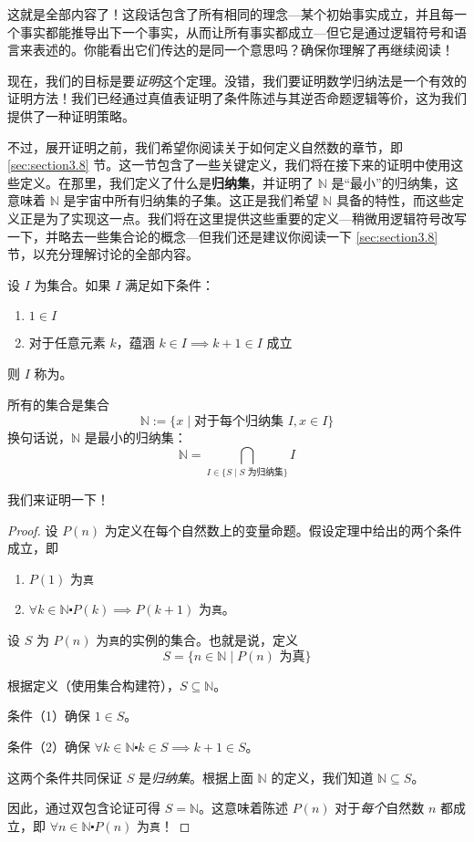 这就是全部内容了！这段话包含了所有相同的理念---某个初始事实成立，并且每一个事实都能推导出下一个事实，从而让所有事实都成立---但它是通过逻辑符号和语言来表述的。你能看出它们传达的是同一个意思吗？确保你理解了再继续阅读！

现在，我们的目标是要\emph{证明}这个定理。没错，我们要证明数学归纳法是一个有效的证明方法！我们已经通过真值表证明了条件陈述与其逆否命题逻辑等价，这为我们提供了一种证明策略。

不过，展开证明之前，我们希望你阅读关于如何定义自然数的章节，即 \ref{sec:section3.8} 节。这一节包含了一些关键定义，我们将在接下来的证明中使用这些定义。在那里，我们定义了什么是\textbf{归纳集}，并证明了 $\mathbb{N}$ 是``最小''的归纳集，这意味着 $\mathbb{N}$ 是宇宙中所有归纳集的子集。这正是我们希望 $\mathbb{N}$ 具备的特性，而这些定义正是为了实现这一点。我们将在这里提供这些重要的定义---稍微用逻辑符号改写一下，并略去一些集合论的概念---但我们还是建议你阅读一下 \ref{sec:section3.8} 节，以充分理解讨论的全部内容。

\begin{definition}
    设 $I$ 为集合。如果 $I$ 满足如下条件：
    \begin{enumerate}
        \item $1 \in I$
        \item 对于任意元素 $k$，蕴涵 $k \in I \implies k + 1 \in I$ 成立
    \end{enumerate}
    则 $I$ 称为。
\end{definition}

\begin{definition}
    所有的集合是集合
    \[\mathbb{N}:=\{x \mid \text{对于每个归纳集 }I, x \in I\}\]
    换句话说，$\mathbb{N}$ 是最小的归纳集：
    \[\mathbb{N} = \bigcap_{I \in \{S \mid S \text{ 为归纳集}\}} I\] 
\end{definition}

我们来证明一下！

\begin{proof}
    设 $P(n)$ 为定义在每个自然数上的变量命题。假设定理中给出的两个条件成立，即
    \begin{enumerate}[label=(\arabic*)]
        \item $P(1)$ 为\verb|真|
        \item $\forall k \in \mathbb{N} \centerdot P(k) \implies P(k+1)$ 为\verb|真|。
    \end{enumerate}

    设 $S$ 为 $P(n)$ 为\verb|真|的实例的集合。也就是说，定义
    \[S = \{n \in \mathbb{N} \mid P(n) \text{ 为真}\}\]

    根据定义（使用集合构建符），$S \subseteq \mathbb{N}$。

    条件（1）确保 $1 \in S$。

    条件（2）确保 $\forall k \in \mathbb{N} \centerdot k \in S \implies k+1 \in S$。

    这两个条件共同保证 $S$ 是\emph{归纳集}。根据上面 $\mathbb{N}$ 的定义，我们知道 $\mathbb{N} \subseteq S$。

    因此，通过双包含论证可得 $S = \mathbb{N}$。这意味着陈述 $P(n)$ 对于\emph{每个}自然数 $n$ 都成立，即 $\forall n \in \mathbb{N} \centerdot P(n)$ 为\verb|真|！
\end{proof}

